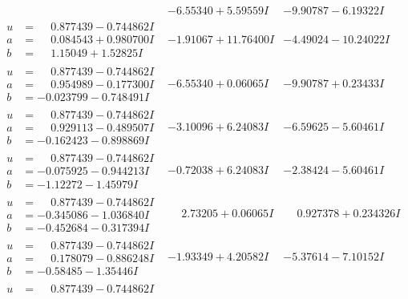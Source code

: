 \documentclass[1p]{elsarticle_modified}
\theoremstyle{definition}
\begin{document}
$$\begin{array}{c|c|c}
 & -6.55340 + 5.59559 I & -9.90787 - 6.19322 I \\ \hline\begin{aligned}
u &= \phantom{-}0.877439 - 0.744862 I \\
a &= \phantom{-}0.084543 + 0.980700 I \\
b &= \phantom{-}1.15049 + 1.52825 I\end{aligned}
 & -1.91067 + 11.76400 I & -4.49024 - 10.24022 I \\ \hline\begin{aligned}
u &= \phantom{-}0.877439 - 0.744862 I \\
a &= \phantom{-}0.954989 - 0.177300 I \\
b &= -0.023799 - 0.748491 I\end{aligned}
 & -6.55340 + 0.06065 I & -9.90787 + 0.23433 I \\ \hline\begin{aligned}
u &= \phantom{-}0.877439 - 0.744862 I \\
a &= \phantom{-}0.929113 - 0.489507 I \\
b &= -0.162423 - 0.898869 I\end{aligned}
 & -3.10096 + 6.24083 I & -6.59625 - 5.60461 I \\ \hline\begin{aligned}
u &= \phantom{-}0.877439 - 0.744862 I \\
a &= -0.075925 - 0.944213 I \\
b &= -1.12272 - 1.45979 I\end{aligned}
 & -0.72038 + 6.24083 I & -2.38424 - 5.60461 I \\ \hline\begin{aligned}
u &= \phantom{-}0.877439 - 0.744862 I \\
a &= -0.345086 - 1.036840 I \\
b &= -0.452684 - 0.317394 I\end{aligned}
 & \phantom{-}2.73205 + 0.06065 I & \phantom{-}0.927378 + 0.234326 I \\ \hline\begin{aligned}
u &= \phantom{-}0.877439 - 0.744862 I \\
a &= \phantom{-}0.178079 - 0.886248 I \\
b &= -0.58485 - 1.35446 I\end{aligned}
 & -1.93349 + 4.20582 I & -5.37614 - 7.10152 I \\ \hline\begin{aligned}
u &= \phantom{-}0.877439 - 0.744862 I \\

\end{aligned}
\end{array}$$
\end{document}
